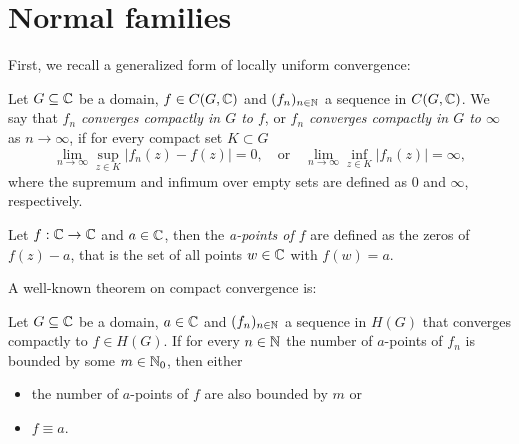 \section{Normal families}
\label{sec:normal-families}

First, we recall a generalized form of locally uniform convergence:

\begin{definition}
    Let $G \subseteq \mathbb{C}$ be a domain, $f \in C(G, \mathbb{C})$ and $(f_n)_{n \in \mathbb{N}}$ a sequence in $C(G, \mathbb{C})$. We say that \emph{$f_n$ converges compactly in $G$ to $f$}, or \emph{$f_n$ converges compactly in $G$ to $\infty$} as $n \to \infty$, if for every compact set $K \subset G$
    \begin{equation}
        \lim_{n \to \infty} \sup_{z \in K} \vert f_n(z) - f(z) \vert = 0, \quad \textrm{or} \quad \lim_{n \to \infty} \inf_{z \in K} \vert f_n(z) \vert = \infty,
    \end{equation}
    where the supremum and infimum over empty sets are defined as $0$ and $\infty$, respectively.
\end{definition}


\begin{definition}
    Let $f : \mathbb{C} \to \mathbb{C}$ and $a \in \mathbb{C}$, then the \emph{a-points of $f$} are defined as the zeros of $f(z) - a$, that is the set of all points $w \in \mathbb{C}$ with $f(w) = a$.
\end{definition}

A well-known theorem on compact convergence is:

\begin{samepage}    
\begin{theorem}[Hurwitz] \label{thm:hurwitz}
    Let $G \subseteq \mathbb{C}$ be a domain, $a \in \mathbb{C}$ and $(f_n)_{n \in \mathbb{N}}$ a sequence in $H(G)$ that converges compactly to $f \in H(G)$. If for every $n \in \mathbb{N}$ the number of $a$-points of $f_n$ is bounded by some $m \in \mathbb{N}_0$, then either
    \begin{itemize}
        \item the number of $a$-points of $f$ are also bounded by $m$ or
        \item $f \equiv a$.
    \end{itemize}
\end{theorem}
\end{samepage}

